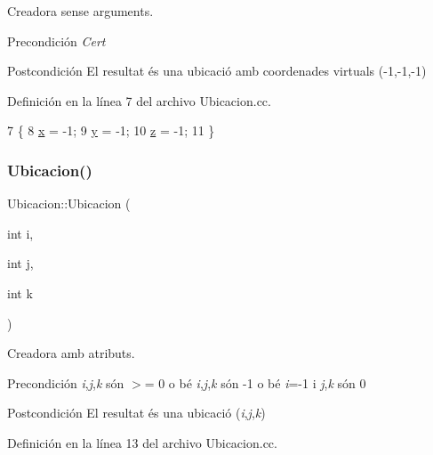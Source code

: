 Creadora sense arguments. 

\begin{DoxyPrecond}{Precondición}
{\itshape Cert} 
\end{DoxyPrecond}
\begin{DoxyPostcond}{Postcondición}
El resultat és una ubicació amb coordenades virtuals (-\/1,-\/1,-\/1) 
\end{DoxyPostcond}


Definición en la línea 7 del archivo Ubicacion.\+cc.


\begin{DoxyCode}
7                      \{
8   \hyperlink{class_ubicacion_aa025967df0ca8761587b09a38cf5b798}{x} = -1;
9   \hyperlink{class_ubicacion_ab314f05b8da651aabb8a623467919a94}{y} = -1;
10   \hyperlink{class_ubicacion_ad74770f35bf4b18d3959b78cd90b6eb0}{z} = -1;
11 \}
\end{DoxyCode}
\mbox{\label{class_ubicacion_a423ae49933ff18f187e1f034d295f4c1}} 
\subsubsection{\texorpdfstring{Ubicacion()}{Ubicacion()}\hspace{0.1cm}{\footnotesize\ttfamily [2/3]}}
{\footnotesize\ttfamily Ubicacion\+::\+Ubicacion (\begin{DoxyParamCaption}\item[{int}]{i,  }\item[{int}]{j,  }\item[{int}]{k }\end{DoxyParamCaption})}



Creadora amb atributs. 

\begin{DoxyPrecond}{Precondición}
{\itshape i},{\itshape j},{\itshape k} són $>$= 0 o bé {\itshape i},{\itshape j},{\itshape k} són -\/1 o bé {\itshape i}=-\/1 i {\itshape j},{\itshape k} són 0 
\end{DoxyPrecond}
\begin{DoxyPostcond}{Postcondición}
El resultat és una ubicació ({\itshape i},{\itshape j},{\itshape k}) 
\end{DoxyPostcond}


Definición en la línea 13 del archivo Ubicacion.\+cc.


